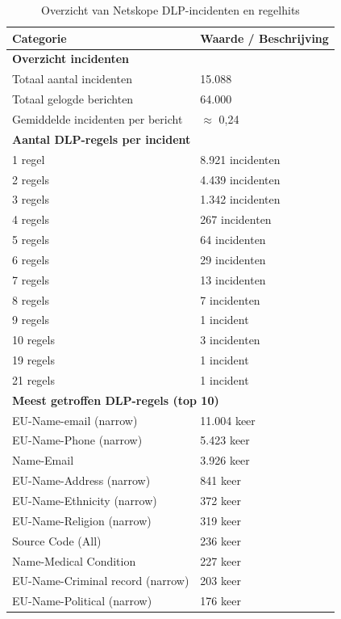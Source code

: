 \begin{table}[h]
    \centering
    \small
    \scriptsize
    \begin{tabular}{ll}
        \toprule
        \textbf{Categorie} & \textbf{Waarde / Beschrijving} \\
        \midrule
        \multicolumn{2}{l}{\textbf{Overzicht incidenten}} \\
        Totaal aantal incidenten & 15.088 \\
        Totaal gelogde berichten & 64.000 \\
        Gemiddelde incidenten per bericht & $\approx$ 0,24 \\[4pt]

        \multicolumn{2}{l}{\textbf{Aantal DLP-regels per incident}} \\
        1 regel & 8.921 incidenten \\
        2 regels & 4.439 incidenten \\
        3 regels & 1.342 incidenten \\
        4 regels & 267 incidenten \\
        5 regels & 64 incidenten \\
        6 regels & 29 incidenten \\
        7 regels & 13 incidenten \\
        8 regels & 7 incidenten \\
        9 regels & 1 incident \\
        10 regels & 3 incidenten \\
        19 regels & 1 incident \\
        21 regels & 1 incident \\[4pt]

        \multicolumn{2}{l}{\textbf{Meest getroffen DLP-regels (top 10)}} \\
        EU-Name-email (narrow) & 11.004 keer \\
        EU-Name-Phone (narrow) & 5.423 keer \\
        Name-Email & 3.926 keer \\
        EU-Name-Address (narrow) & 841 keer \\
        EU-Name-Ethnicity (narrow) & 372 keer \\
        EU-Name-Religion (narrow) & 319 keer \\
        Source Code (All) & 236 keer \\
        Name-Medical Condition & 227 keer \\
        EU-Name-Criminal record (narrow) & 203 keer \\
        EU-Name-Political (narrow) & 176 keer \\
        \bottomrule
    \end{tabular}
    \caption{Overzicht van Netskope DLP-incidenten en regelhits}
    \label{tab:netskope_dlp_resultaten}
\end{table}
